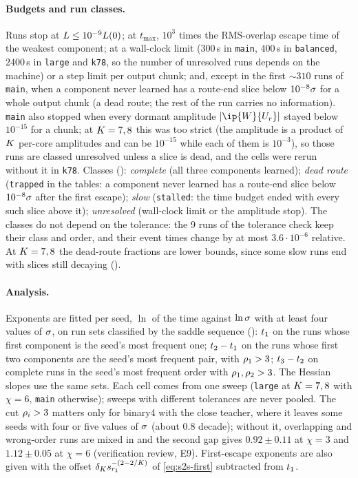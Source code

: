 \paragraph{Budgets and run classes.}
Runs stop at $L\le10^{-9}L(0)$; at $t_{\max}$, $10^3$ times the RMS-overlap escape time of the weakest
component; at a wall-clock limit ($300$\,s in \texttt{main}, $400$\,s in \texttt{balanced}, $2400$\,s in
\texttt{large} and \texttt{k78}, so the number of unresolved runs depends on the machine) or a step limit per
output chunk; and, except in the first ${\sim}310$ runs of \texttt{main}, when a component never learned has a
route-end slice below $10^{-8}\sigma$ for a whole output chunk (a dead route; the rest of the run carries no
information). \texttt{main} also stopped when every dormant amplitude $\abs{\ip{\W}{\U r}}$ stayed below $10^{-15}$
for a chunk; at $K=7,8$ this was too strict (the amplitude is a product of $K$ per-core amplitudes and can be
$10^{-15}$ while each of them is $10^{-3}$), so those runs are classed unresolved unless a slice is dead, and
the cells were rerun without it in \texttt{k78}. Classes (): \emph{complete} (all three
components learned); \emph{dead route} (\texttt{trapped} in the tables: a component never learned has a
route-end slice below $10^{-8}\sigma$ after the first escape); \emph{slow} (\texttt{stalled}: the time budget ended
with every such slice above it); \emph{unresolved} (wall-clock limit or the amplitude stop). The classes do not
depend on the tolerance: the 9 runs of the tolerance check keep their class and order, and their event times
change by at most $3.6\cdot10^{-6}$ relative. At $K=7,8$ the dead-route fractions are lower bounds, since some
slow runs end with slices still decaying ().

\paragraph{Analysis.}
Exponents are fitted per seed, $\ln$ of the time against $\ln\sigma$ with at least four values of $\sigma$, on run
sets classified by the saddle sequence (): $t_{1}$ on the runs whose first
component is the seed's most frequent one; $t_{2}-t_{1}$ on the runs whose first two components are the
seed's most frequent pair, with $\rho_{1}>3$; $t_{3}-t_{2}$ on complete runs in the seed's most frequent order
with $\rho_{1},\rho_{2}>3$. The Hessian slopes use the same sets. Each cell comes from one sweep (\texttt{large} at
$K=7,8$ with $\chi=6$, \texttt{main} otherwise); sweeps with different tolerances are never pooled. The cut
$\rho_{i}>3$ matters only for binary4 with the close teacher, where it leaves some seeds with four or five
values of $\sigma$ (about $0.8$ decade); without it, overlapping and wrong-order runs are mixed in and the
second gap gives $0.92\pm0.11$ at $\chi=3$ and $1.12\pm0.05$ at $\chi=6$ (verification review, E9).
First-escape exponents are also given with the offset $\delta_Ks_{r_1}^{-(2-2/K)}$ of
\eqref{eq:s2s-first} subtracted from $t_{1}$.

